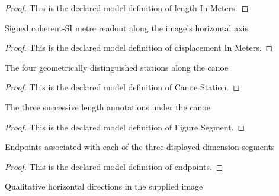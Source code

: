\begin{proof}
  This is the declared model definition of length In Meters.
\end{proof}
\begin{definition}
  \label{def:physics:phyx-mini-0769:phyxminiproblems-problemphyxmini0769-displacementinmeters}
  Signed coherent-SI metre readout along the image's horizontal axis
\end{definition}
\begin{proof}
  This is the declared model definition of displacement In Meters.
\end{proof}
\begin{definition}
  \label{def:physics:phyx-mini-0769:phyxminiproblems-problemphyxmini0769-canoestation}
  The four geometrically distinguished stations along the canoe
\end{definition}
\begin{proof}
  This is the declared model definition of Canoe Station.
\end{proof}
\begin{definition}
  \label{def:physics:phyx-mini-0769:phyxminiproblems-problemphyxmini0769-figuresegment}
  The three successive length annotations under the canoe
\end{definition}
\begin{proof}
  This is the declared model definition of Figure Segment.
\end{proof}
\begin{definition}[endpoints]
  \label{def:physics:phyx-mini-0769:phyxminiproblems-problemphyxmini0769-figuresegment-endpoints}
  Endpoints associated with each of the three displayed dimension segments
\end{definition}
\begin{proof}
  This is the declared model definition of endpoints.
\end{proof}
\begin{definition}
  \label{def:physics:phyx-mini-0769:phyxminiproblems-problemphyxmini0769-horizontaldirection}
  Qualitative horizontal directions in the supplied image
\end{definition}
